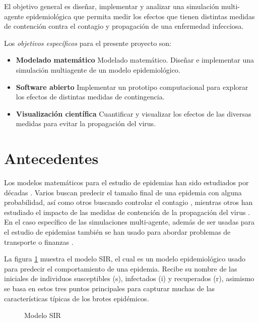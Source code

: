 \documentclass[a4]{sciposter}
\begin{document}
\begin{multicols}{2}
El objetivo general es diseñar, implementar y analizar una simulación multi-agente epidemiológica que permita medir los efectos que tienen distintas medidas de contención contra el contagio y propagación de una enfermedad infecciosa.\par
Los \emph{objetivos específicos} para el presente proyecto son:\par
\begin{itemize}
  \item \textbf{Modelado matemático} Modelado matemático. Diseñar e implementar una simulación multiagente de un modelo epidemiológico.
  \item \textbf{Software abierto} Implementar un prototipo computacional para explorar los efectos de distintas medidas de contingencia.
  \item \textbf{Visualización científica} Cuantificar y visualizar los efectos de las diversas medidas para evitar la propagación del virus.
\end{itemize}

\section{Antecedentes}
Los modelos matemáticos para el estudio de epidemias han sido estudiados por décadas \cite{decadas}. Varios buscan predecir el tamaño final de una epidemia con alguna probabilidad, así como otros buscando controlar el contagio \cite{contagio}, mientras otros han estudiado el impacto de las medidas de contención de la propagación del virus \cite{virus}. En el caso específico de las simulaciones multi-agente, además de ser usadas para el estudio de epidemias \cite{epidemias} también se han usado para abordar problemas de transporte \cite{transporte} o finanzas \cite{finanzas}.

La figura \ref{diag} muestra el modelo SIR, el cual es un modelo epidemiológico usado para predecir el comportamiento de una epidemia. Recibe su nombre de las iniciales de individuos susceptibles (s), infectados (i) y recuperados (r), asimismo se basa en estos tres puntos principales para capturar muchas de las características típicas de los brotes epidémicos.

\begin{figure}
\captionsetup{type=figure}
\setcounter{figure}{0}
\begin{center}
\end{center}
\caption{Modelo SIR}
\label{diag}
\end{figure}


\end{multicols}
\end{document}
